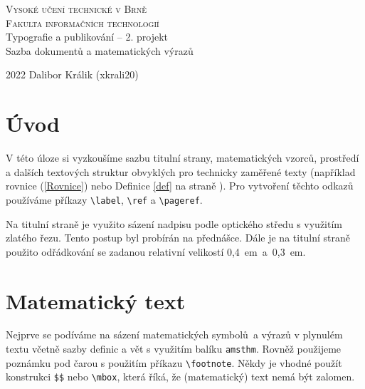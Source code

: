 \documentclass[a4paper, 11pt, twocolumn]{article}
\theoremstyle{definition}
\theoremstyle{definition}
\begin{document}
\thispagestyle{empty}

\begin{titlepage}
\begin{center}
    
    \Huge
    \textsc{
    Vysoké učení technické v Brně\\[0.4em]}
    \huge
    \textsc{
    Fakulta informačních technologií}\\
    {\LARGE
    Typografie a publikování -- 2. projekt\\[0.3em]
    Sazba dokumentů a matematických výrazů\\
    }
\end{center}

{\Large 2022 \hfill
Dalibor Králik (xkrali20)}

\end{titlepage}
\newpage


\section*{Úvod}

V této úloze si vyzkoušíme sazbu titulní strany, matematic\-kých vzorců, prostředí a dalších textových struktur obvyklých pro technicky zaměřené texty (například rovnice (\ref{Rovnice}) nebo Definice \ref{def} na straně \pageref{def}). Pro vytvoření těchto odkazů používáme příkazy \texttt{{\textbackslash label}}, \texttt{{\textbackslash ref}} a \texttt{{\textbackslash pageref}}.\par

Na titulní straně je využito sázení nadpisu podle optického středu s využitím zlatého řezu. Tento postup byl probírán na přednášce. Dále je na titulní straně použito odřádkování se zadanou relativní velikostí 0,4~em~a~0,3~em.



\section{Matematický text}

Nejprve se podíváme na sázení matematických symbolů~a výrazů v plynulém textu včetně sazby definic a vět s využitím balíku \texttt{amsthm}. Rovněž použijeme poznámku pod čarou s použitím příkazu \texttt{{\textbackslash footnote}}. Někdy je vhodné použít konstrukci \texttt{\$\string{\string}\$} nebo \texttt{{\textbackslash mbox\string{\string}}}, která říká, že (matematický) text nemá být zalomen. 
\end{document}
